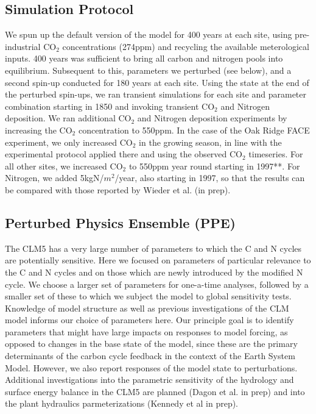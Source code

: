 \documentclass[draft,linenumbers]{agujournal}
\begin{document}
\subsection{Simulation Protocol}
We spun up the default version of the model for 400 years at each site, using pre-industrial CO$_{2}$ concentrations (274ppm) and recycling the available meterological inputs. 400 years was sufficient to bring all carbon and nitrogen pools into equilibrium. Subsequent to this, parameters we perturbed (see below), and a second spin-up conducted for 180 years at each site. Using the state at the end of the perturbed spin-ups, we ran transient simulations for each site and parameter combination starting in 1850 and invoking transient CO$_{2}$ and Nitrogen deposition. We ran additional CO$_{2}$ and Nitrogen deposition experiments by increasing the CO$_{2}$ concentration to 550ppm. In the case of the Oak Ridge FACE experiment, we only increased CO$_{2}$ in the growing season, in line with the experimental protocol applied there and using the observed CO$_{2}$ timeseries. For all other sites, we increased CO$_{2}$ to 550ppm year round starting in 1997**.  For Nitrogen, we added 5kgN/$m^{2}$/year, also starting in 1997, so that the results can be compared with those reported by Wieder et al. (in prep). 

\subsection{Perturbed Physics Ensemble (PPE)}
The CLM5 has a very large number of parameters to which the C and N cycles are potentially sensitive. Here we focused on parameters of particular relevance to the C and N cycles and on those which are newly introduced by the modified N cycle. We choose a larger set of parameters for one-a-time analyses, followed by a smaller set of these to which we subject the model to global sensitivity tests. Knowledge of model structure as well as previous investigations of the CLM model informs our choice of parameters here. Our principle goal is to identify parameters that might have large impacts on responses to model forcing, as opposed to changes in the base state of the model, since these are the primary determinants of the carbon cycle feedback in the context of the Earth System Model.  However, we also report responses of the model state to perturbations. Additional investigations into the parametric sensitivity of the hydrology and surface energy balance in the CLM5 are planned (Dagon et al. in prep) and into the plant hydraulics parmeterizations (Kennedy et al in prep).
\end{document}
